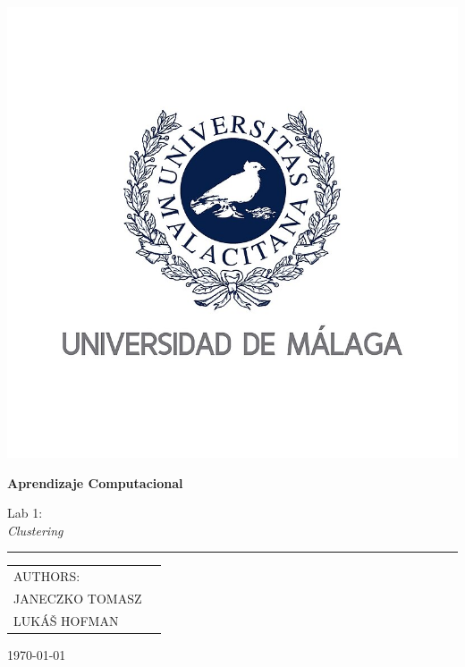 \documentclass[runningheads]{llncs}
\begin{document}
\begin{titlepage}
\scshape
\centering
\includegraphics[scale=0.57]{logo.png} \par \vspace{0.1cm}
\huge 

{\huge{\textbf{Aprendizaje Computacional}}}\par \vspace{0.4cm}
Lab 1: \\ \textit{Clustering}
\rule{\textwidth}{2px}

\begin{tabularx}{\textwidth}{X r}
AUTHORS:\\
\large{JANECZKO TOMASZ}   & \\
\large{LUKÁŠ HOFMAN}   &  \\
\end{tabularx}
\vfill
\today

\end{titlepage}

\newpage

\end{document}
